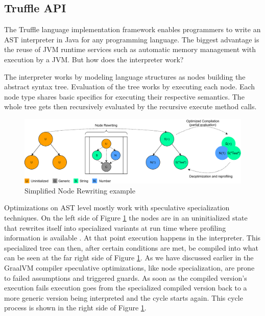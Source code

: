 \subsection{Truffle API}
The Truffle language implementation framework enables programmers to write an AST interpreter in Java for any programming language. The biggest advantage is the reuse of JVM runtime services such as automatic memory management with execution by a JVM. But how does the interpreter work?

The interpreter works by modeling language structures as nodes building the abstract syntax tree. Evaluation of the tree works by executing each node. Each node type shares basic specifics for executing their respective semantics. The whole tree gets then recursively evaluated by the recursive execute method calls.

\begin{figure}[h!]
    \centering
    \includegraphics[scale=0.7]{figures/NodeJIT.png}
    \caption{Simplified Node Rewriting example}
    \label{fig:trufNR}
\end{figure}

Optimizations on AST level mostly work with speculative specialization techniques. On the left side of Figure \ref{fig:trufNR} the nodes are in an uninitialized state that rewrites itself into specialized variants at run time where profiling information is available \cite{wuerthSelf}. At that point execution happens in the interpreter. This specialized tree can then, after certain conditions are met, be compiled into what can be seen at the far right side of Figure \ref{fig:trufNR}. As we have discussed earlier in the GraalVM compiler speculative optimizations, like node specialization, are prone to failed assumptions and triggered guards. As soon as the compiled version's execution fails execution goes from the specialized compiled version back to a more generic version being interpreted and the cycle starts again. This cycle process is shown in the right side of Figure \ref{fig:trufNR}.


